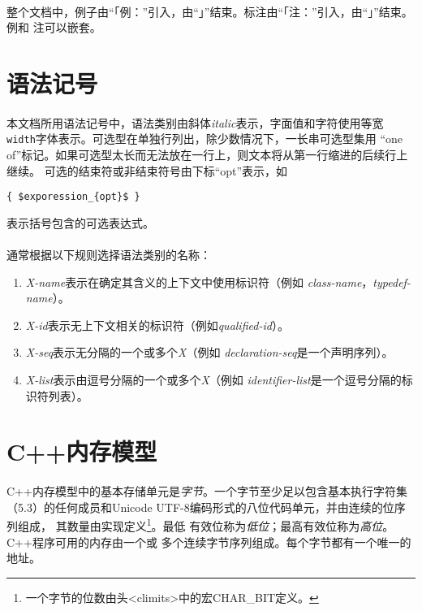 \paragraph{}
整个文档中，例子由“「例：”引入，由“」”结束。标注由“「注：”引入，由“」”结束。例和
注可以嵌套。

\section{语法记号}
\paragraph{}
本文档所用语法记号中，语法类别由斜体\textit{italic}表示，字面值和字符使用等宽
\texttt{width}字体表示。可选型在单独行列出，除少数情况下，一长串可选型集用
“one of”标记。如果可选型太长而无法放在一行上，则文本将从第一行缩进的后续行上继续。
可选的结束符或非结束符号由下标“opt”表示，如
\begin{lstlisting}[mathescape]
  { $exporession_{opt}$ }
\end{lstlisting}
表示括号包含的可选表达式。

\paragraph{}
通常根据以下规则选择语法类别的名称：
\begin{enumerate}
  \item \textit{X-name}表示在确定其含义的上下文中使用标识符（例如
    \textit{class-name}，\textit{typedef-name}）。
  \item \textit{X-id}表示无上下文相关的标识符（例如\textit{qualified-id}）。
  \item \textit{X-seq}表示无分隔的一个或多个\textit{X}（例如
    \textit{declaration-seq}是一个声明序列）。
  \item \textit{X-list}表示由逗号分隔的一个或多个\textit{X}（例如
    \textit{identifier-list}是一个逗号分隔的标识符列表）。
\end{enumerate}

\section{C++内存模型}
\paragraph{}
C++内存模型中的基本存储单元是\textit{字节}。一个字节至少足以包含基本执行字符集
（5.3）的任何成员和Unicode UTF-8编码形式的八位代码单元，并由连续的位序列组成，
其数量由实现定义\footnote{一个字节的位数由头<climits>中的宏CHAR\_BIT定义。}。最低
有效位称为\textit{低位}；最高有效位称为\textit{高位}。C++程序可用的内存由一个或
多个连续字节序列组成。每个字节都有一个唯一的地址。


